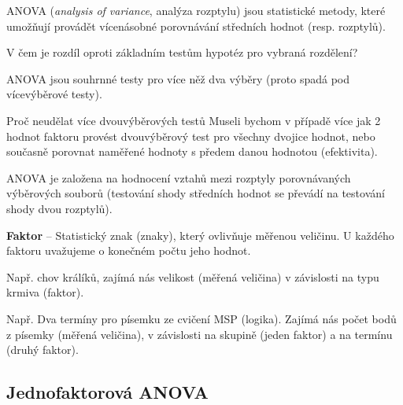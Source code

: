 \begin{compactitem}
    \item ANOVA (\textit{analysis of variance}, analýza rozptylu) jsou statistické metody, které umožňují provádět vícenásobné porovnávání středních hodnot (resp. rozptylů).

    \item V čem je rozdíl oproti základním testům hypotéz pro vybraná rozdělení?

    \begin{compactitem}
        \item ANOVA jsou souhrnné testy pro více něž dva výběry (proto spadá pod vícevýběrové testy).

        \item Proč neudělat více dvouvýběrových testů Museli bychom v případě více jak 2 hodnot faktoru provést dvouvýběrový test pro všechny dvojice hodnot, nebo současně porovnat naměřené hodnoty s předem danou hodnotou (efektivita).
    \end{compactitem}

    \item ANOVA je založena na hodnocení vztahů mezi rozptyly porovnávaných výběrových souborů (testování shody středních hodnot se převádí na testování shody dvou rozptylů).

    \item \textbf{Faktor} -- Statistický znak (znaky), který ovlivňuje měřenou veličinu. U každého faktoru uvažujeme o konečném počtu jeho hodnot.  \begin{compactitem}
        \item Např. chov králíků, zajímá nás velikost (měřená veličina) v závislosti na typu krmiva (faktor).

        \item Např. Dva termíny pro písemku ze cvičení MSP (logika). Zajímá nás počet bodů z písemky (měřená veličina), v závislosti na skupině (jeden faktor) a na termínu (druhý faktor).
    \end{compactitem}
\end{compactitem}

\subsection{Jednofaktorová ANOVA}

